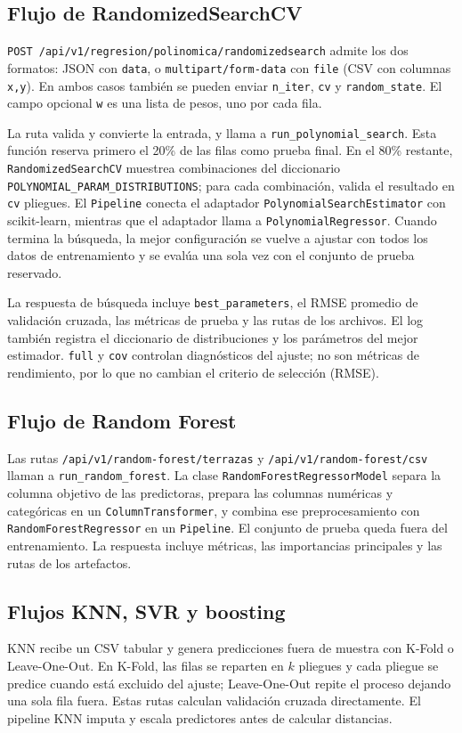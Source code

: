 \documentclass[11pt,a4paper]{article}
\begin{document}
\subsection{Flujo de RandomizedSearchCV}
\texttt{POST /api/v1/regresion/polinomica/randomizedsearch} admite los dos formatos: JSON con \texttt{data}, o \texttt{multipart/form-data} con \texttt{file} (CSV con columnas \texttt{x,y}). En ambos casos también se pueden enviar \texttt{n\_iter}, \texttt{cv} y \texttt{random\_state}. El campo opcional \texttt{w} es una lista de pesos, uno por cada fila.

La ruta valida y convierte la entrada, y llama a \texttt{run\_polynomial\_search}. Esta función reserva primero el 20\% de las filas como prueba final. En el 80\% restante, \texttt{RandomizedSearchCV} muestrea combinaciones del diccionario \texttt{POLYNOMIAL\_PARAM\_DISTRIBUTIONS}; para cada combinación, valida el resultado en \texttt{cv} pliegues. El \texttt{Pipeline} conecta el adaptador \texttt{PolynomialSearchEstimator} con scikit-learn, mientras que el adaptador llama a \texttt{PolynomialRegressor}. Cuando termina la búsqueda, la mejor configuración se vuelve a ajustar con todos los datos de entrenamiento y se evalúa una sola vez con el conjunto de prueba reservado.

La respuesta de búsqueda incluye \texttt{best\_parameters}, el RMSE promedio de validación cruzada, las métricas de prueba y las rutas de los archivos. El log también registra el diccionario de distribuciones y los parámetros del mejor estimador. \texttt{full} y \texttt{cov} controlan diagnósticos del ajuste; no son métricas de rendimiento, por lo que no cambian el criterio de selección (RMSE).

\subsection{Flujo de Random Forest}
Las rutas \texttt{/api/v1/random-forest/terrazas} y \texttt{/api/v1/random-forest/csv} llaman a \texttt{run\_random\_forest}. La clase \texttt{RandomForestRegressorModel} separa la columna objetivo de las predictoras, prepara las columnas numéricas y categóricas en un \texttt{ColumnTransformer}, y combina ese preprocesamiento con \texttt{RandomForestRegressor} en un \texttt{Pipeline}. El conjunto de prueba queda fuera del entrenamiento. La respuesta incluye métricas, las importancias principales y las rutas de los artefactos.

\subsection{Flujos KNN, SVR y boosting}
KNN recibe un CSV tabular y genera predicciones fuera de muestra con K-Fold o Leave-One-Out. En K-Fold, las filas se reparten en $k$ pliegues y cada pliegue se predice cuando está excluido del ajuste; Leave-One-Out repite el proceso dejando una sola fila fuera. Estas rutas calculan validación cruzada directamente. El pipeline KNN imputa y escala predictores antes de calcular distancias.
\end{document}
